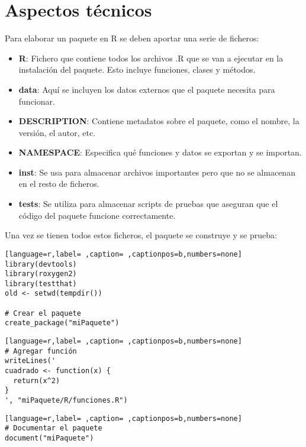 \section{Aspectos técnicos}
\label{sec:org654c559}
Para elaborar un paquete en R se deben aportar una serie de ficheros:
\begin{itemize}
\item \textbf{R}: Fichero que contiene todos los archivos .R que se van a ejecutar en la instalación del paquete. Esto incluye funciones, clases y métodos.
\item \textbf{data}: Aquí se incluyen los datos externos que el paquete necesita para funcionar.
\item \textbf{DESCRIPTION}: Contiene metadatos sobre el paquete, como el nombre, la versión, el autor, etc.
\item \textbf{NAMESPACE}: Especifica qué funciones y datos se exportan y se importan.
\item \textbf{inst}: Se usa para almacenar archivos importantes pero que no se almacenan en el resto de ficheros.
\item \textbf{tests}: Se utiliza para almacenar scripts de pruebas que aseguran que el código del paquete funcione correctamente.
\end{itemize}
Una vez se tienen todos estos ficheros, el paquete se construye y se prueba:
\begin{lstlisting}[language=r,label= ,caption= ,captionpos=b,numbers=none]
library(devtools)
library(roxygen2)
library(testthat)
old <- setwd(tempdir())

# Crear el paquete
create_package("miPaquete")
\end{lstlisting}

\begin{lstlisting}[language=r,label= ,caption= ,captionpos=b,numbers=none]
# Agregar función
writeLines('
cuadrado <- function(x) {
  return(x^2)
}
', "miPaquete/R/funciones.R")
\end{lstlisting}

\begin{lstlisting}[language=r,label= ,caption= ,captionpos=b,numbers=none]
# Documentar el paquete
document("miPaquete")
\end{lstlisting}
